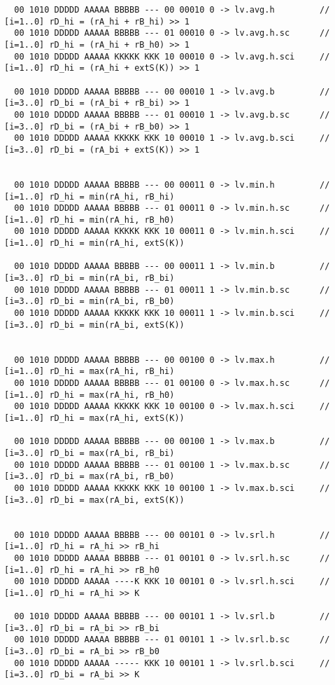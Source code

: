 \begin{landscape}
\begin{verbatim}
  00 1010 DDDDD AAAAA BBBBB --- 00 00010 0 -> lv.avg.h         // [i=1..0] rD_hi = (rA_hi + rB_hi) >> 1
  00 1010 DDDDD AAAAA BBBBB --- 01 00010 0 -> lv.avg.h.sc      // [i=1..0] rD_hi = (rA_hi + rB_h0) >> 1
  00 1010 DDDDD AAAAA KKKKK KKK 10 00010 0 -> lv.avg.h.sci     // [i=1..0] rD_hi = (rA_hi + extS(K)) >> 1

  00 1010 DDDDD AAAAA BBBBB --- 00 00010 1 -> lv.avg.b         // [i=3..0] rD_bi = (rA_bi + rB_bi) >> 1
  00 1010 DDDDD AAAAA BBBBB --- 01 00010 1 -> lv.avg.b.sc      // [i=3..0] rD_bi = (rA_bi + rB_b0) >> 1
  00 1010 DDDDD AAAAA KKKKK KKK 10 00010 1 -> lv.avg.b.sci     // [i=3..0] rD_bi = (rA_bi + extS(K)) >> 1


  00 1010 DDDDD AAAAA BBBBB --- 00 00011 0 -> lv.min.h         // [i=1..0] rD_hi = min(rA_hi, rB_hi)
  00 1010 DDDDD AAAAA BBBBB --- 01 00011 0 -> lv.min.h.sc      // [i=1..0] rD_hi = min(rA_hi, rB_h0)
  00 1010 DDDDD AAAAA KKKKK KKK 10 00011 0 -> lv.min.h.sci     // [i=1..0] rD_hi = min(rA_hi, extS(K))

  00 1010 DDDDD AAAAA BBBBB --- 00 00011 1 -> lv.min.b         // [i=3..0] rD_bi = min(rA_bi, rB_bi)
  00 1010 DDDDD AAAAA BBBBB --- 01 00011 1 -> lv.min.b.sc      // [i=3..0] rD_bi = min(rA_bi, rB_b0)
  00 1010 DDDDD AAAAA KKKKK KKK 10 00011 1 -> lv.min.b.sci     // [i=3..0] rD_bi = min(rA_bi, extS(K))


  00 1010 DDDDD AAAAA BBBBB --- 00 00100 0 -> lv.max.h         // [i=1..0] rD_hi = max(rA_hi, rB_hi)
  00 1010 DDDDD AAAAA BBBBB --- 01 00100 0 -> lv.max.h.sc      // [i=1..0] rD_hi = max(rA_hi, rB_h0)
  00 1010 DDDDD AAAAA KKKKK KKK 10 00100 0 -> lv.max.h.sci     // [i=1..0] rD_hi = max(rA_hi, extS(K))

  00 1010 DDDDD AAAAA BBBBB --- 00 00100 1 -> lv.max.b         // [i=3..0] rD_bi = max(rA_bi, rB_bi)
  00 1010 DDDDD AAAAA BBBBB --- 01 00100 1 -> lv.max.b.sc      // [i=3..0] rD_bi = max(rA_bi, rB_b0)
  00 1010 DDDDD AAAAA KKKKK KKK 10 00100 1 -> lv.max.b.sci     // [i=3..0] rD_bi = max(rA_bi, extS(K))


  00 1010 DDDDD AAAAA BBBBB --- 00 00101 0 -> lv.srl.h         // [i=1..0] rD_hi = rA_hi >> rB_hi
  00 1010 DDDDD AAAAA BBBBB --- 01 00101 0 -> lv.srl.h.sc      // [i=1..0] rD_hi = rA_hi >> rB_h0
  00 1010 DDDDD AAAAA ----K KKK 10 00101 0 -> lv.srl.h.sci     // [i=1..0] rD_hi = rA_hi >> K

  00 1010 DDDDD AAAAA BBBBB --- 00 00101 1 -> lv.srl.b         // [i=3..0] rD_bi = rA_bi >> rB_bi
  00 1010 DDDDD AAAAA BBBBB --- 01 00101 1 -> lv.srl.b.sc      // [i=3..0] rD_bi = rA_bi >> rB_b0
  00 1010 DDDDD AAAAA ----- KKK 10 00101 1 -> lv.srl.b.sci     // [i=3..0] rD_bi = rA_bi >> K



\end{verbatim}
\end{landscape}

